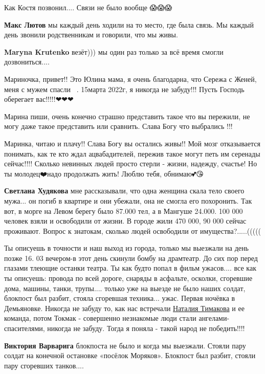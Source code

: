 
Как Костя позвонил.... Связи не было вообще 😱😱😱

\begin{itemize} %
\textbf{Макс Лютов} мы каждый день ходили на то место, где была связь. Мы каждый день звонили родственникам и говорили, что мы живы.

\textbf{Maryna Krutenko} везёт))) мы один раз только за всё время смогли дозвониться....
\end{itemize} %


Мариночка, привет!! Это Юлина мама, я очень благодарна, что Сережа с Женей, меня с
мужем спасли🙏🙏🙏. 15марта 2022г, я никогда не забуду!!! Пусть Господь
оберегает вас!!!!!❤❤❤


Марина пиши, очень конечно страшно представить такое что вы пережили, не могу
даже такое представить или сравнить. Слава Богу что выбрались !!!


Маринка, читаю и плачу!! Слава Богу вы остались живы!! Мой мозг отказывается
понимать, как те кто ждал ацвабадителей, пережив такое могут петь им серенады
сейчас!!!! Сколько невинных людей просто стерли - жизни, надежду, счастье! Но ты
молодец❤️надо продолжать жить! Люблю тебя, обнимаю💕😘

\begin{itemize} %
\textbf{Светлана Худякова} мне рассказывали, что одна женщина скала тело своего мужа... он погиб в квартире и они убежали, она не смогла его похоронить. Так вот, в морге на Левом берегу было 87.000 тел, а в Мангуше 24.000. 100 000 человек взяли и освободили от жизни. В городе жили 470 000, 90 000 сейчас проживают. Вопрос к знатокам, сколько людей освободили от имущества?.....(((((
\end{itemize} %


Ты описуешь в точности и наш выход из города, только мы выезжали на день позже
16. 03 вечером-в этот день скинули бомбу на драмтеатр. До сих пор перед глазами
тлеющие останки театра. Ты как будто попал в фильм ужасов.... все как ты
описуешь: провода по всей дороге, снаряды в асфальте, осколки, сгоревшие дома,
машины, танки, трупы.... только уже на выезде не было наших солдат, блокпост был
разбит, стояла сгоревшая техника... ужас. Первая ночёвка в Демьяновке. Никогда не
забуду то, как нас встречали \href{https://www.facebook.com/profile.php?id=100005210680976}{Наталия Тимакова} и ее команда, потом
Токмак - совершенно незнакомые люди стали ангелами-спасителями, никогда не
забуду. Тогда я поняла - такой народ не победить!!!!

\begin{itemize} %
\textbf{Виктория Варварига} блокпоста не было и когда мы выезжали. Стояли пару солдат на конечной остановке «посёлок Моряков». Блокпост был разбит, стояли пару сгоревших танков....
\end{itemize} %

